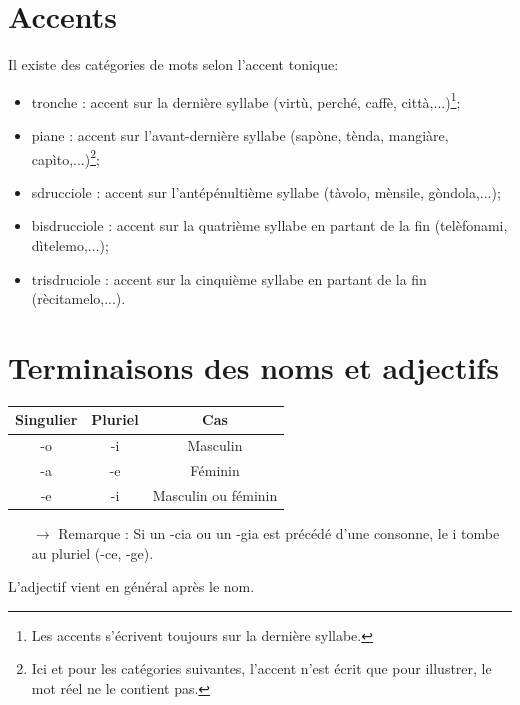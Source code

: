 \documentclass[12pt, openany]{report}
\begin{document}
\section{Accents}
Il existe des catégories de mots selon l'accent tonique:
\begin{itemize}
    \item tronche : accent sur la dernière syllabe (virtù, perché, caffè, città,...)\footnote{Les accents s'écrivent toujours sur la dernière syllabe.};
    \item piane : accent sur l'avant-dernière syllabe (sapòne, tènda, mangiàre, capìto,...)\footnote{Ici et pour les catégories suivantes, l'accent n'est écrit que pour illustrer, le mot réel ne le contient pas.};
    \item sdrucciole : accent sur l'antépénultième syllabe (tàvolo, mènsile, gòndola,...);
    \item bisdrucciole : accent sur la quatrième syllabe en partant de la fin (telèfonami, dìtelemo,...);
    \item trisdruciole : accent sur la cinquième syllabe en partant de la fin (rècitamelo,...).
\end{itemize}
\section{Terminaisons des noms et adjectifs}
\begin{center}
    \begin{tabular}{c|c|c}
        Singulier & Pluriel & Cas\\
        \hline
        -o & -i & Masculin \\
        -a & -e & Féminin \\
        -e & -i & Masculin ou féminin\\
    \end{tabular}
\end{center}
\begin{itemize}
    \item [$\rightarrow$] Remarque : Si un -cia ou un -gia est précédé d'une consonne, le i tombe au pluriel (-ce, -ge).
\end{itemize}
L'adjectif vient en général après le nom.
\end{document}
